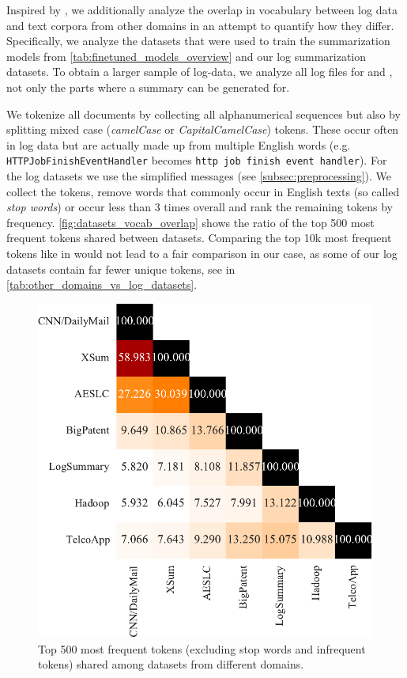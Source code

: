 Inspired by \parencite{dont_stop_pretraining}, we additionally analyze the overlap in vocabulary
between log data and text corpora from other domains in an attempt to quantify how they differ.
Specifically, we analyze the datasets that were used to train the summarization models from
\autoref{tab:finetuned_models_overview} and our log summarization datasets.
To obtain a larger sample of log-data, we analyze all log files for \telco{} and \hadoop{}, not only the parts where a summary can be generated for.

We tokenize all documents by collecting all alphanumerical sequences but also by splitting mixed case (\emph{camelCase} or \emph{CapitalCamelCase}) tokens.
These occur often in log data but are actually made up from multiple English words
(e.g. \verb+HTTPJobFinishEventHandler+ becomes \verb+http job finish event handler+).
For the log datasets we use the simplified messages (see \autoref{subsec:preprocessing}).
We collect the tokens, remove words that commonly occur in English texts (so called \emph{stop words})
or occur less than 3 times overall and rank the remaining tokens by frequency.
\autoref{fig:datasets_vocab_overlap} shows the ratio of the top 500 most frequent tokens shared between datasets.
Comparing the top 10k most frequent tokens like in \parencite{dont_stop_pretraining} would not lead to a fair comparison in our case,
as some of our log datasets contain far fewer unique tokens, see \logsummary{} in \autoref{tab:other_domains_vs_log_datasets}.

\begin{figure}[htbp]
\centering
\includegraphics[width=.75\textwidth]{images/thesis/500_vocab_overlap_correlation}
\caption{Top 500 most frequent tokens (excluding stop words and infrequent tokens) shared among datasets from different domains.}
\label{fig:datasets_vocab_overlap}
\end{figure}


